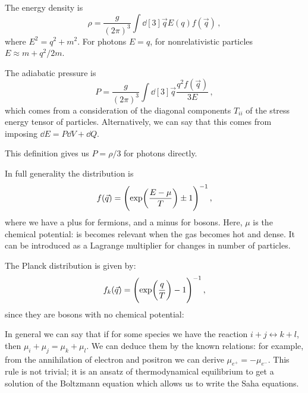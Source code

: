 \documentclass[main.tex]{subfiles}
\begin{document}
The energy density is 
%
\begin{equation}
  \rho = \frac{g}{(2 \pi )^3} \int \dd[3]{\vec{q}} E(q) f(\vec{q}) 
\,,
\end{equation}
%
where \(E^2 = q^2 + m^2\). For photons \(E = q\), for nonrelativistic particles \(E \approx m + q^2 / 2m\).

The adiabatic pressure is 
%
\begin{equation}
  P = \frac{g}{(2 \pi )^3} \int \dd[3]{\vec{q}} \frac{q^2 f(\vec{q})}{3E} 
\,,
\end{equation}
%
which comes from a consideration of the diagonal components \(T_{ii}\) of the stress energy tensor of particles. Alternatively, we can say that this comes from imposing \(\dd{E} = P \dd{V} + \dd{Q} \).

This definition gives us \(P = \rho /3\) for photons directly.

In full generality the distribution is 
%
\begin{equation}
  f(\vec{q}) = \qty(\exp(\frac{E- \mu }{T}) \pm 1 )^{-1}
\,,
\end{equation}
%
where we have a plus for fermions, and a minus for bosons. Here, \(\mu \) is the chemical potential: is becomes relevant when the gas becomes hot and dense.
It can be introduced as a Lagrange multiplier for changes in number of particles.

The Planck distribution is given by: 
%
\begin{equation}
  f_k(\vec{q}) = \qty(\exp(\frac{q}{T}) -1 )^{-1}
\,,
\end{equation}
%
since they are bosons with no chemical potential:

In general we can say that if for some species we have the reaction \(i+j \leftrightarrow k+l\), then \(\mu _i + \mu _j = \mu _k + \mu _l\). We can deduce them by the known relations: for example, from the annihilation of electron and positron we can derive \(\mu _{e^{+}} = - \mu_{e^{-}}\).
This rule is not trivial; it is an ansatz of thermodynamical equilibrium to get a solution of the Boltzmann equation which allows us to write the Saha equations.
\end{document}
